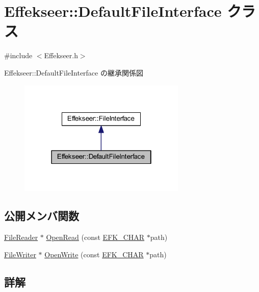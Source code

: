 \hypertarget{class_effekseer_1_1_default_file_interface}{}\section{Effekseer\+:\+:Default\+File\+Interface クラス}
\label{class_effekseer_1_1_default_file_interface}


{\ttfamily \#include $<$Effekseer.\+h$>$}



Effekseer\+:\+:Default\+File\+Interface の継承関係図\nopagebreak
\begin{figure}[H]
\begin{center}
\leavevmode
\includegraphics[width=226pt]{class_effekseer_1_1_default_file_interface__inherit__graph}
\end{center}
\end{figure}
\subsection*{公開メンバ関数}
\begin{DoxyCompactItemize}
\item 
\mbox{\hyperlink{class_effekseer_1_1_file_reader}{File\+Reader}} $\ast$ \mbox{\hyperlink{class_effekseer_1_1_default_file_interface_a03d6224d1eb0124a21f42c578e447d51}{Open\+Read}} (const \mbox{\hyperlink{_effekseer_8h_a50b026abea014b47854bcd835b3b6233}{E\+F\+K\+\_\+\+C\+H\+AR}} $\ast$path)
\item 
\mbox{\hyperlink{class_effekseer_1_1_file_writer}{File\+Writer}} $\ast$ \mbox{\hyperlink{class_effekseer_1_1_default_file_interface_aecbcd4350ca701360dcea88a2c5f9c64}{Open\+Write}} (const \mbox{\hyperlink{_effekseer_8h_a50b026abea014b47854bcd835b3b6233}{E\+F\+K\+\_\+\+C\+H\+AR}} $\ast$path)
\end{DoxyCompactItemize}


\subsection{詳解}



